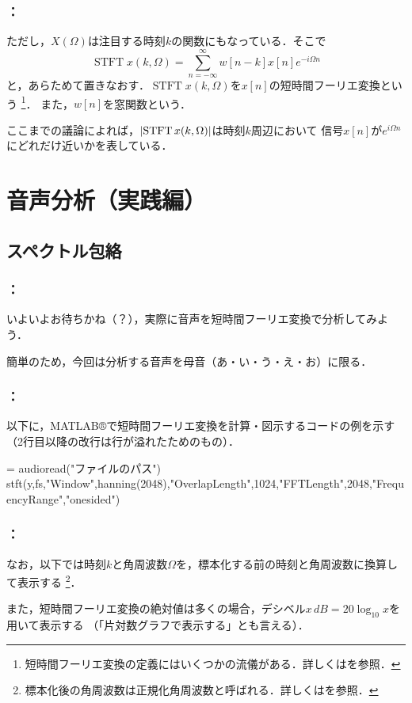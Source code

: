 \documentclass[unicode,11pt]{beamer}
\newcommand{\termdef}[1]{\alert{\sffamily #1}}
\DeclarePairedDelimiter{\abs}{\lvert}{\rvert}
\DeclareMathOperator{\STFT}{STFT}
\begin{document}
\begin{frame}
  \frametitle{\secname ：\subsecname}
  ただし，\(X(\Omega)\)は注目する時刻\(k\)の関数にもなっている．そこで
  \[
    \STFT x(k,\Omega) = \sum_{n=-\infty}^\infty w[n-k]x[n]e^{-i\Omega n}
  \]
  と，あらためて置きなおす．\(\STFT x(k,\Omega)\)を\(x[n]\)の\termdef{短時間フーリエ変換}という
  \footnote{短時間フーリエ変換の定義にはいくつかの流儀がある．詳しくは\cite{yatabe2019,ono2016}を参照．}．
  また，\(w[n]\)を\termdef{窓関数}という．

  ここまでの議論によれば，\(\abs{\STFT x(k,\Omega)}\)は時刻\(k\)周辺において
  信号\(x[n]\)が\(e^{i\Omega n}\)にどれだけ近いかを表している．
\end{frame}

\section{音声分析（実践編）}
\subsection{スペクトル包絡}
\begin{frame}
  \frametitle{\secname ：\subsecname}  
  いよいよお待ちかね（？），実際に音声を短時間フーリエ変換で分析してみよう．

  簡単のため，今回は分析する音声を母音（あ・い・う・え・お）に限る．
\end{frame}

\begin{frame}[fragile]
  \frametitle{\secname ：\subsecname}
  以下に，MATLAB®で短時間フーリエ変換を計算・図示するコードの例を示す（2行目以降の改行は行が溢れたためのもの）．
  \begin{codeblock}
[y,fs] = audioread("ファイルのパス")
stft(y,fs,"Window",hanning(2048),"OverlapLength",1024,"FFTLength",2048,"FrequencyRange","onesided")
  \end{codeblock}
\end{frame}

\begin{frame}
  \frametitle{\secname ：\subsecname}
  なお，以下では時刻\(k\)と角周波数\(\Omega\)を，標本化する前の時刻と角周波数に換算して表示する
  \footnote{標本化後の角周波数は\termdef{正規化角周波数}と呼ばれる．詳しくは\cite{kagami}を参照．}．

  また，短時間フーリエ変換の絶対値は多くの場合，\termdef{デシベル}\(x\,\si{dB}=20\log_{10}x\)を用いて表示する
  （「片対数グラフで表示する」とも言える）．
\end{frame}
\end{document}

